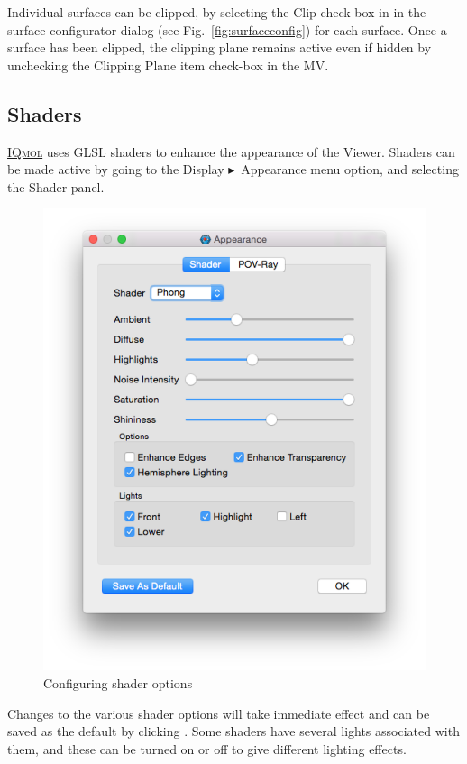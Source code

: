 \documentclass[a4paper,12pt]{article}
\newcommand{\iqmol}{\href{http://iqmol.org}{{\scshape IQmol}}}
\newcommand{\bt}{\ensuremath{\blacktriangleright}}
\begin{document}
Individual surfaces can be clipped, by selecting the Clip check-box in in the
surface configurator dialog (see Fig.~\ref{fig:surfaceconfig}) for each
surface.  Once a surface has been clipped, the clipping plane remains active
even if hidden by unchecking the Clipping Plane item check-box in the MV.


\subsection{Shaders}

\iqmol{} uses GLSL shaders to enhance the appearance of the Viewer.  Shaders can
be made active by going to the Display \bt\ Appearance menu option, and selecting
the Shader panel.
\begin{figure}[h]
\begin{center}
\includegraphics[scale=0.20]{figures/ShaderDialog.png}
\caption{Configuring shader options}
\end{center}
\end{figure}

Changes to the various shader options will take immediate effect and can be saved 
as the default by clicking .  Some shaders have several
lights associated with them, and these can be turned on or off to give different
lighting effects.
\end{document}
